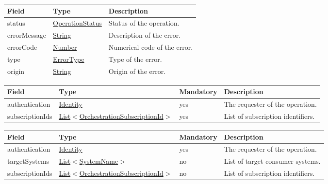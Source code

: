 \documentclass[a4paper]{arrowhead}
\newcommand{\pref}[1]{{\textcolor{ArrowheadGrey}{\hyperref[sec:model:primitives:#1]{#1}}}}
\begin{document}

\begin{table}[ht!]
\begin{tabularx}{\textwidth}{| p{4.25cm} | p{3.5cm} | X |} \hline
\rowcolor{gray!33} Field & Type      & Description \\ \hline
status & \pref{OperationStatus} & Status of the operation. \\ \hline
errorMessage & \pref{String} & Description of the error. \\ \hline
errorCode &\pref{Number}  & Numerical code of the error. \\ \hline
type & \pref{ErrorType} & Type of the error. \\ \hline
origin & \pref{String} & Origin of the error. \\ \hline
\end{tabularx}
\end{table}


\begin{table}[ht!]
\begin{tabularx}{\textwidth}{| p{2.5cm} | p{6.3cm} | p{2cm} | X |} \hline
\rowcolor{gray!33} Field & Type & Mandatory & Description \\ \hline
authentication & \hyperref[sec:model:Identity]{Identity} & yes & The requester of the operation. \\ \hline
subscriptionIds &  \pref{List}$<$\pref{OrchestrationSubscriptionId}$>$ & yes & List of subscription identifiers. \\ \hline
\end{tabularx}
\end{table}

\clearpage


\begin{table}[ht!]
\begin{tabularx}{\textwidth}{| p{2.5cm} | p{6.3cm} | p{2cm} | X |} \hline
\rowcolor{gray!33} Field & Type & Mandatory & Description \\ \hline
authentication & \hyperref[sec:model:Identity]{Identity} & yes & The requester of the operation. \\ \hline
targetSystems &  \pref{List}$<$\pref{SystemName}$>$ & no & List of target consumer systems. \\ \hline
subscriptionIds &  \pref{List}$<$\pref{OrchestrationSubscriptionId}$>$ & no & List of subscription identifiers. \\ \hline
\end{tabularx}
\end{table}
\end{document}
